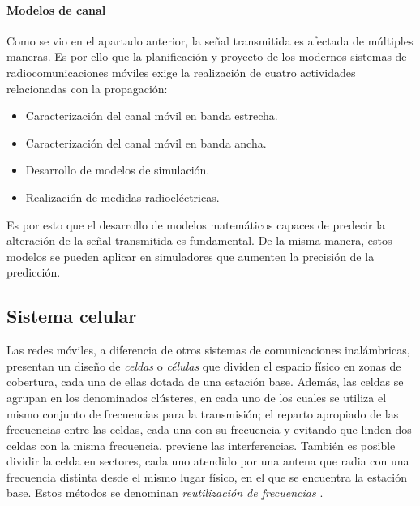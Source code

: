 \documentclass[12pt]{report} %
\begin{document}
\paragraph{Modelos de canal}

%

Como se vio en el apartado anterior, la señal transmitida es afectada de múltiples maneras.
Es por ello que la planificación y proyecto de los modernos sistemas de radiocomunicaciones móviles exige la realización de cuatro actividades relacionadas con la propagación:
\begin{itemize}
	\item Caracterización del canal móvil en banda estrecha.
	\item Caracterización del canal móvil en banda ancha.
	\item Desarrollo de modelos de simulación.
	\item Realización de medidas radioeléctricas.
\end{itemize}

Es por esto que el desarrollo de modelos matemáticos capaces de predecir la alteración de la señal transmitida es fundamental.
De la misma manera, estos modelos se pueden aplicar en simuladores que aumenten la precisión de la predicción.

\subsection{Sistema celular}

Las redes móviles, a diferencia de otros sistemas de comunicaciones inalámbricas, presentan un diseño de \textit{celdas} o \textit{células} que dividen el espacio físico en zonas de cobertura, cada una de ellas dotada de una estación base.
Además, las celdas se agrupan en los denominados clústeres, en cada uno de los cuales se utiliza el mismo conjunto de frecuencias para la transmisión;
el reparto apropiado de las frecuencias entre las celdas, cada una con su frecuencia y evitando que linden dos celdas con la misma frecuencia, previene las interferencias.
También es posible dividir la celda en sectores, cada uno atendido por una antena que radia con una frecuencia distinta desde el mismo lugar físico, en el que se encuentra la estación base.
Estos métodos se denominan \textit{reutilización de frecuencias} \cite{RefWorks:91}.
\end{document}

